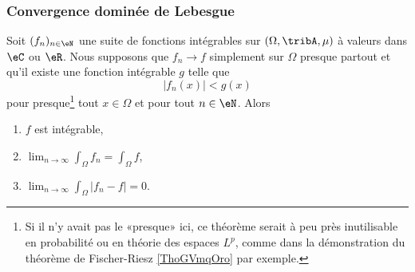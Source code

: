 \subsubsection{Convergence dominée de Lebesgue}

\begin{theorem}        \label{ThoConvDomLebVdhsTf}
    Soit \( (f_n)_{n\in\eN}\) une suite de fonctions intégrables sur \( (\Omega,\tribA,\mu)\) à valeurs dans \( \eC\) ou \( \eR\). Nous supposons que  \( f_n\to f\) simplement sur \( \Omega\) presque partout et qu'il existe une fonction intégrable \( g\) telle que
    \begin{equation}
        | f_n(x) |< g(x) 
    \end{equation}
    pour presque\footnote{Si il n'y avait pas le «presque» ici, ce théorème serait à peu près inutilisable en probabilité ou en théorie des espaces \( L^p\), comme dans la démonstration du théorème de Fischer-Riesz \ref{ThoGVmqOro} par exemple.} tout \( x\in\Omega\) et pour tout \( n\in \eN\). Alors
    \begin{enumerate}
        \item
            \( f\) est intégrable,
        \item
           $\lim_{n\to \infty} \int_{\Omega}f_n=\int_\Omega f$,
        \item
            $\lim_{n\to \infty} \int_{\Omega}| f_n-f |=0$.
    \end{enumerate}
\end{theorem}


